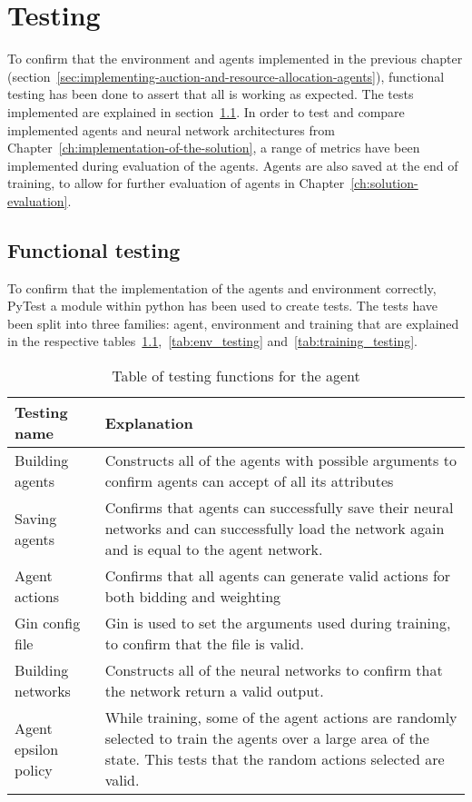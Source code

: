 \chapter{Testing}\label{ch:testing-of-the-implementation}
To confirm that the environment and agents implemented in the previous chapter
(section~\ref{sec:implementing-auction-and-resource-allocation-agents}), functional testing has been done to assert that
all is working as expected. The tests implemented are explained in section~\ref{sec:functional-testing}. In order to
test and compare implemented agents and neural network architectures from Chapter~\ref{ch:implementation-of-the-solution},
a range of metrics have been implemented during evaluation of the agents. Agents are also saved at the end of training,
to allow for further evaluation of agents in Chapter~\ref{ch:solution-evaluation}.

\section{Functional testing}\label{sec:functional-testing}
To confirm that the implementation of the agents and environment correctly, PyTest a module within python has been used
to create tests. The tests have been split into three families: agent, environment and training that are explained
in the respective tables~\ref{tab:agent_testing},~\ref{tab:env_testing} and~\ref{tab:training_testing}.

\begin{table}[h]
    \centering
    \begin{tabular}{|p{3cm}|p{8cm}|} \hline
        \textbf{Testing name} & \textbf{Explanation} \\ \hline
        Building agents & Constructs all of the agents with possible arguments to confirm agents can accept of all its
            attributes\\ \hline
        Saving agents & Confirms that agents can successfully save their neural networks and can successfully load
            the network again and is equal to the agent network. \\ \hline
        Agent actions & Confirms that all agents can generate valid actions for both bidding and weighting \\ \hline
        Gin config file & Gin is used to set the arguments used during training, to confirm that the file is valid. \\ \hline
        Building networks & Constructs all of the neural networks to confirm that the network return a valid output. \\ \hline
        Agent epsilon policy & While training, some of the agent actions are randomly selected to train the agents over
            a large area of the state. This tests that the random actions selected are valid. \\ \hline
    \end{tabular}
    \caption{Table of testing functions for the agent}
    \label{tab:agent_testing}
\end{table}


